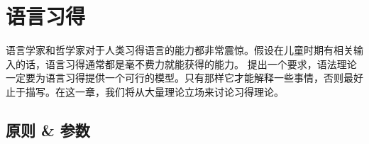 \chapter{语言习得}
\label{chap-acquisition}

语言学家和哲学家对于人类习得语言的能力都非常震惊。假设在儿童时期有相关输入的话，语言习得通常都是毫不费力就能获得的能力。 \citet[--25]{Chomsky65a}提出一个要求，语法理论一定要为语言习得提供一个可行的模型。只有那样它才能解释一些事情，否则最好止于描写。在这一章，我们将从大量理论立场来讨论习得理论。

\section{原则 \& 参数}
\label{Abschnitt-PP}\label{sec-pro-drop}

